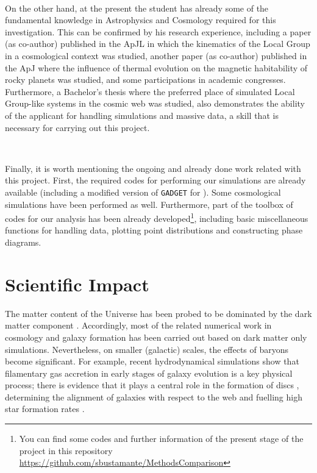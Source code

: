 \documentclass[a4,useAMS,usenatbib,usegraphicx,12pt]{article}
\begin{document}
\

On the other hand, at the present the student has already some of the fundamental 
knowledge in Astrophysics and Cosmology required for this investigation. This can 
be confirmed by his research experience, including a paper (as co-author) 
published in the ApJL in which the kinematics of the Local Group in a cosmological 
context was studied, another paper (as co-author) published in the ApJ where the 
influence of thermal evolution on the magnetic habitability of rocky planets was 
studied, and some participations in academic congresses. Furthermore, a Bachelor’s 
thesis where the preferred place of simulated Local Group-like systems in the 
cosmic web was studied, also demonstrates the ability of the applicant for 
handling simulations and massive data, a skill that is necessary for carrying out 
this project.

\

Finally, it is worth mentioning the ongoing and already done work related with 
this project. First, the required codes for performing our simulations are already
available (including a modified version of \texttt{GADGET} for \VPH). Some
cosmological simulations have been performed as well. Furthermore, part of the 
toolbox of codes for our analysis has been already developed\footnote{You can 
find some codes and further information of the present stage of the project in 
this repository \url{https://github.com/sbustamante/MethodsComparison}}, 
including basic miscellaneous functions for handling data, plotting point 
distributions and constructing phase diagrams.


\section{Scientific Impact}
The matter content of the Universe has been probed to be dominated by the dark 
matter component \citep{Planck13XVI}. Accordingly, most of the related numerical 
work in cosmology and galaxy formation has been carried out based on dark matter 
only simulations. Nevertheless, on smaller (galactic) scales, the effects of 
baryons become significant. For example, recent hydrodynamical simulations show 
that filamentary gas accretion in early stages of galaxy evolution is a key 
physical process; there is evidence that it plays a central role in the formation 
of discs \citep{Dubois14}, determining the alignment of galaxies with respect to 
the web \citep{Hahn10} and fuelling high star formation rates \citep{Dekel09}.
\end{document}
